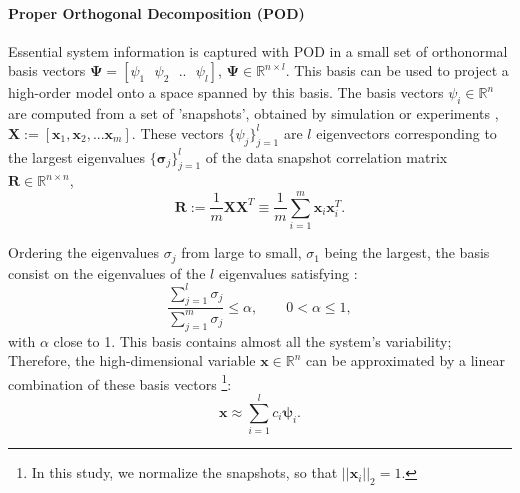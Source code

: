 \documentclass[times,final]{elsarticle}
\begin{document}
\paragraph{Proper Orthogonal Decomposition (POD)} Essential system information is captured with POD in a small set of orthonormal basis vectors $\mathbf{\Psi}=[\psi_1 \text{ }\psi_2 \text{ }.. \text{ }\psi_l]$, $\mathbf{\Psi} \in \mathbb{R}^{n\times l}. $ This basis can be used to project a high-order model onto a space spanned by this basis.
The basis vectors $\psi_i\in \mathbb{R}^n$ are computed from a set of 'snapshots', obtained by simulation or experiments \cite{Mark06}, $\mathbf{X}:=[\mathbf{x}_1,\mathbf{x}_2,...\mathbf{x}_m]$. These vectors $\{ \psi _j \} ^l _{j=1}$ are $l$ eigenvectors corresponding to 
the largest eigenvalues $\{ \mathbf{\sigma} _j \} ^l _{j=1}$ of the data snapshot correlation matrix $\mathbf{R}\in \mathbb{R}^{n \times n}$,
\begin{equation}\label{eq:POD}
\mathbf{R}:= \frac{1}{m}\mathbf{X}\mathbf{X}^T \equiv \frac{1}{m} \sum_{i=1}^m \mathbf{x}_i \mathbf{x}_i^T.
\end{equation}\par
Ordering the eigenvalues  $\sigma_j$ from large to small, $\sigma_1$ being
the largest, the basis consist on the eigenvalues of the $l$ eigenvalues satisfying \cite{Mark06}:
\begin{equation}
\frac{\sum_{j=1}^l\sigma_j}{\sum_{j=1}^m\sigma_j}\leq \alpha, \qquad 0<\alpha \leq 1,
\end{equation}
with $\alpha$ close to 1.   
This basis contains almost all the system's variability; Therefore, the high-dimensional variable $\mathbf{x} \in \mathbb{R}^n$
can be approximated by a linear combination of these basis vectors \cite{Astrid11}\footnote{In this study, we normalize the snapshots, so that $||\mathbf{x}_i||_2=1.$}:
\begin{equation}\label{eq4}
  \mathbf{x}\approx \sum_{i=1}^lc_i \mathbf{\psi}_i.
\end{equation}
\end{document}
